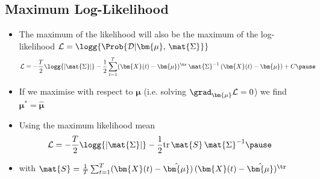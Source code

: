 \begin{slide}
\section[-2]{Maximum Log-Likelihood}

\begin{PauseHighLight}
  \begin{itemize}
  \item The maximum of the likelihood will also be the maximum of the
    log-likelihood $\mathcal{L} = \logg{\Prob{\mathcal{D}|
        \bm{\mu},\,\mat{\Sigma}}}$
    \begin{align*}
      \mathcal{L} &= -\frac{T}{2} \logg{|\mat{\Sigma}|}
                    -\frac{1}{2} \sum_{t=1}^T
                    (\bm{X}(t)-\bm{\mu})^\tr \,\mat{\Sigma}^{-1}
                    \,(\bm{X}(t)-\bm{\mu}) + C\pause
    \end{align*}
  \item If we maximise with respect to $\bm{\mu}$ (i.e. solving $\grad_{\bm{\mu}}
    \mathcal{L}=0$) we find $\bm{\mu}^* = \hat{\bm{\mu}}$\pause
  \item Using the maximum likelihood mean
    \begin{align*}
      \mathcal{L} &= -\frac{T}{2} \logg{|\mat{\Sigma}|}
                    -\frac{1}{2} \mathrm{tr}\,
                    \mat{S}\,\mat{\Sigma}^{-1}\pause
    \end{align*}
  \item with $\mat{S} = \tfrac{1}{T} \sum_{t=1}^T
    (\bm{X}(t)-\hat{\bm{\mu}})\,(\bm{X}(t)-\hat{\bm{\mu}})^\tr$\pause
  \end{itemize}
\end{PauseHighLight}

\end{slide}


